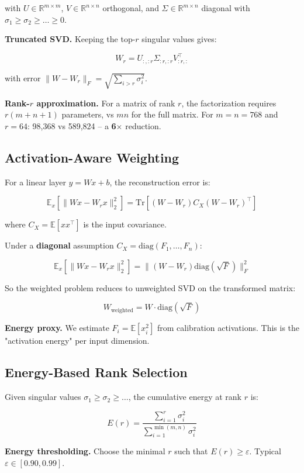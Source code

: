 with $U \in \mathbb{R}^{m \times m}$, $V \in \mathbb{R}^{n \times n}$ 
orthogonal, and $\Sigma \in \mathbb{R}^{m \times n}$ diagonal with 
$\sigma_1 \geq \sigma_2 \geq \dots \geq 0$.

\textbf{Truncated SVD.} Keeping the top-$r$ singular values gives:

\[
W_r = U_{:, :r} \Sigma_{:r, :r} V_{:r, :}^\top
\]

with error $\|W - W_r\|_F = \sqrt{\sum_{i > r} \sigma_i^2}$.

\textbf{Rank-$r$ approximation.} For a matrix of rank $r$, the factorization 
requires $r(m + n + 1)$ parameters, vs $mn$ for the full matrix. For 
$m = n = 768$ and $r = 64$: 98,368 vs 589,824 -- a \textbf{6$\times$} reduction.

\subsection{Activation-Aware Weighting}

For a linear layer $y = Wx + b$, the reconstruction error is:

\[
\mathbb{E}_x[\|Wx - W_r x\|_2^2] = \text{Tr}[(W - W_r) C_X (W - W_r)^\top]
\]

where $C_X = \mathbb{E}[x x^\top]$ is the input covariance.

Under a \textbf{diagonal} assumption $C_X = \text{diag}(F_1, \dots, F_n)$:

\[
\mathbb{E}_x[\|Wx - W_r x\|_2^2] = \|(W - W_r) \text{diag}(\sqrt{F})\|_F^2
\]

So the weighted problem reduces to unweighted SVD on the transformed matrix:

\[
W_\text{weighted} = W \cdot \text{diag}(\sqrt{F})
\]

\textbf{Energy proxy.} We estimate $F_i = \mathbb{E}[x_i^2]$ from calibration 
activations. This is the "activation energy" per input dimension.

\subsection{Energy-Based Rank Selection}

Given singular values $\sigma_1 \geq \sigma_2 \geq \dots$, the cumulative 
energy at rank $r$ is:

\[
E(r) = \frac{\sum_{i=1}^r \sigma_i^2}{\sum_{i=1}^{\min(m, n)} \sigma_i^2}
\]

\textbf{Energy thresholding.} Choose the minimal $r$ such that $E(r) \geq \varepsilon$. 
Typical $\varepsilon \in [0.90, 0.99]$.

